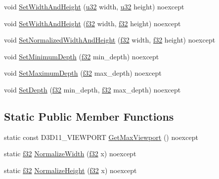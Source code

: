 \begin{DoxyCompactItemize}
\item 
void \hyperlink{structmage_1_1_viewport_ae305839e53f6c76e8c0366f6622570f1}{Set\+Width\+And\+Height} (\hyperlink{namespacemage_af2b398bf98eb10351f49cad73fe2cc73}{u32} width, \hyperlink{namespacemage_af2b398bf98eb10351f49cad73fe2cc73}{u32} height) noexcept
\item 
void \hyperlink{structmage_1_1_viewport_ac5d7b3e55c7f76573e323d109001e7f6}{Set\+Width\+And\+Height} (\hyperlink{namespacemage_a6a44ad388483959dc4dff9f2aef91431}{f32} width, \hyperlink{namespacemage_a6a44ad388483959dc4dff9f2aef91431}{f32} height) noexcept
\item 
void \hyperlink{structmage_1_1_viewport_a53a2793324607aa80427cc4f29e6cea9}{Set\+Normalized\+Width\+And\+Height} (\hyperlink{namespacemage_a6a44ad388483959dc4dff9f2aef91431}{f32} width, \hyperlink{namespacemage_a6a44ad388483959dc4dff9f2aef91431}{f32} height) noexcept
\item 
void \hyperlink{structmage_1_1_viewport_ac4f5351670df1fe28f02ee4418a07084}{Set\+Minimum\+Depth} (\hyperlink{namespacemage_a6a44ad388483959dc4dff9f2aef91431}{f32} min\+\_\+depth) noexcept
\item 
void \hyperlink{structmage_1_1_viewport_a5c81f436b1cdc411014c6f0a3d9e60d2}{Set\+Maximum\+Depth} (\hyperlink{namespacemage_a6a44ad388483959dc4dff9f2aef91431}{f32} max\+\_\+depth) noexcept
\item 
void \hyperlink{structmage_1_1_viewport_a1cec151634662ec11fa01f20e06fa04b}{Set\+Depth} (\hyperlink{namespacemage_a6a44ad388483959dc4dff9f2aef91431}{f32} min\+\_\+depth, \hyperlink{namespacemage_a6a44ad388483959dc4dff9f2aef91431}{f32} max\+\_\+depth) noexcept
\end{DoxyCompactItemize}
\subsection*{Static Public Member Functions}
\begin{DoxyCompactItemize}
\item 
static const D3\+D11\+\_\+\+V\+I\+E\+W\+P\+O\+RT \hyperlink{structmage_1_1_viewport_aec4a434cbb6f68805d02f1be6ecbf5a8}{Get\+Max\+Viewport} () noexcept
\item 
static \hyperlink{namespacemage_a6a44ad388483959dc4dff9f2aef91431}{f32} \hyperlink{structmage_1_1_viewport_ae4ab5c7e81795c3ff98472e1a7786ef6}{Normalize\+Width} (\hyperlink{namespacemage_a6a44ad388483959dc4dff9f2aef91431}{f32} x) noexcept
\item 
static \hyperlink{namespacemage_a6a44ad388483959dc4dff9f2aef91431}{f32} \hyperlink{structmage_1_1_viewport_a7ca3b41ed9c470c821c86dfd4158b80b}{Normalize\+Height} (\hyperlink{namespacemage_a6a44ad388483959dc4dff9f2aef91431}{f32} x) noexcept
\end{DoxyCompactItemize}
